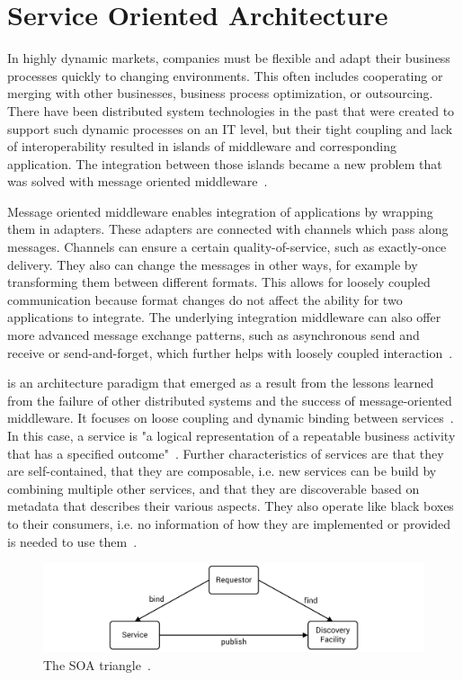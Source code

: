 \section{Service Oriented Architecture}
\label{fundamentals:service}

In highly dynamic markets, companies must be flexible and adapt their business processes quickly to changing environments.
This often includes cooperating or merging with other businesses, business process optimization, or outsourcing.
There have been distributed system technologies in the past that were created to support such dynamic processes on an IT level, but their tight coupling and lack of interoperability resulted in islands of middleware and corresponding application.
The integration between those islands became a new problem that was solved with message oriented middleware~\autocite{webservices}.

Message oriented middleware enables integration of applications by wrapping them in adapters.
These adapters are connected with channels which pass along messages.
Channels can ensure a certain quality-of-service, such as exactly-once delivery.
They also can change the messages in other ways, for example by transforming them between different formats.
This allows for loosely coupled communication because format changes do not affect the ability for two applications to integrate.
The underlying integration middleware can also offer more advanced message exchange patterns, such as asynchronous send and receive or send-and-forget, which further helps with loosely coupled interaction~\autocite{webservices}.

 is an architecture paradigm that emerged as a result from the lessons learned from the failure of other distributed systems and the success of message-oriented middleware.
It focuses on loose coupling and dynamic binding between services~\autocite{webservices}.
In this case, a service is "a logical representation of a repeatable business activity that has a specified outcome"~\autocite{soa}.
Further characteristics of services are that they are self-contained, that they are composable, i.e. new services can be build by combining multiple other services, and that they are discoverable based on metadata that describes their various aspects.
They also operate like black boxes to their consumers, i.e. no information of how they are implemented or provided is needed to use them~\autocite{webservices}.

\begin{figure}[!htbp]
	\centering
	\includegraphics[resolution=600]{fundamentals/assets/triangle}
	\caption{The SOA triangle~\autocite[based on][]{webservices}.}
	\label{image:triangle}
\end{figure}

